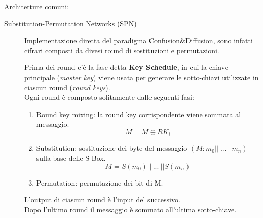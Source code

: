 \documentclass[target=bach,aauheader=,style=]{thud}
\begin{document}
            Architetture comuni:
            \begin{description}
                \item[Substitution-Permutation Networks (SPN)] Implementazione diretta del paradigma Confusion\&Diffusion\cite{moderncrypto}, sono infatti cifrari composti da divesi round di sostituzioni e permutazioni\cite{handcypto}.

                Prima dei round c'è la fase detta \textbf{Key Schedule}, in cui la chiave principale (\textit{master key}) viene usata per generare le sotto-chiavi utilizzate in ciascun round (\textit{round keys}).\\
                Ogni round è composto solitamente dalle seguenti fasi\cite{moderncrypto}:                
                \begin{enumerate}
                    \item Round key mixing: la round key corrispondente viene sommata al messaggio. \[M = M \oplus RK_i\]
                    \item Substitution: sostituzione dei byte del messaggio $(M:m_0||\ ...\ ||m_n)$ sulla base delle S-Box. \[M=S(m_0)||\ ...\ ||S(m_n)\]
                    \item Permutation: permutazione dei bit di M.
                \end{enumerate}
                L'output di ciascun round è l'input del successivo.\\
                Dopo l'ultimo round il messaggio è sommato all'ultima sotto-chiave.
                \begin{figure}[h!]
                    \centering
\end{figure}
\end{description}
\end{document}
